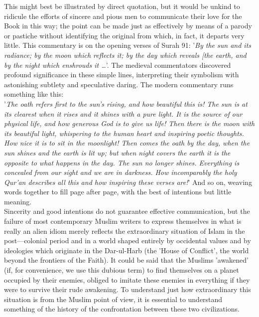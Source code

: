 \documentclass[11pt, b5paper, twoside]{book}
\begin{document}
This might best be illustrated by direct quotation, but it would be unkind to ridicule the efforts of sincere and pious men to communicate their love for the Book in this way; the point can be made just as effectively by means of a parody or pastiche without identifying the original from which, in fact, it departs very little. This commentary is on the opening verses of Surah 91: '\emph{By the sun and its radiance; by the moon which reflects it; by the day which reveals [the earth, and by the night which enshrouds it \ldots{}}'. The medieval commentators discovered profound significance in these simple lines, interpreting their symbolism with astonishing subtlety and speculative daring. The modern commentary runs something like this:\\

'\emph{The oath refers first to the sun's rising, and how beautiful this is! The sun is at its clearest when it rises and it shines with a pure light. It is the source of our physical life, and how generous God is to give us life! Then there is the moon with its beautiful light, whispering to the human heart and inspiring poetic thoughts. How nice it is to sit in the moonlight! Then comes the oath by the day, when the sun shines and the earth is lit up; but when night covers the earth it is the opposite to what happens in the day. The sun no longer shines. Everything is concealed from our sight and we are in darkness. How incomparably the holy Qur'an describes all this and how inspiring these verses are!}' And so on, weaving words together to fill page after page, with the best of intentions but little meaning. \\

Sincerity and good intentions do not guarantee effective communication, but the failure of most contemporary Muslim writers to express themselves in what is really an alien idiom merely reflects the extraordinary situation of Islam in the post---colonial period and in a world shaped entirely by occidental values and by ideologies which originate in the Dar-ul-Harb (the 'House of Conflict', the world beyond the frontiers of the Faith). It could be said that the Muslims 'awakened' (if, for convenience, we use this dubious term) to find themselves on a planet occupied by their enemies, obliged to imitate these enemies in everything if they were to survive their rude awakening. To understand just how extraordinary this situation is from the Muslim point of view, it is essential to understand something of the history of the confrontation between these two civilizations. \\
\end{document}
